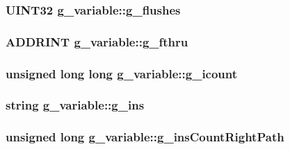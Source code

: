\label{structg__variable_ae22303265d64707d4e5c29a9fc9bae70}
\hypertarget{structg__variable_aee7d9a2652e4ea63755601664d7f2a00}{
\subsubsection[{g\_\-flushes}]{\setlength{\rightskip}{0pt plus 5cm}UINT32 {\bf g\_\-variable::g\_\-flushes}}}
\label{structg__variable_aee7d9a2652e4ea63755601664d7f2a00}
\hypertarget{structg__variable_ab5c10d6f80328bc1f3c99709d7d5db46}{
\subsubsection[{g\_\-fthru}]{\setlength{\rightskip}{0pt plus 5cm}ADDRINT {\bf g\_\-variable::g\_\-fthru}}}
\label{structg__variable_ab5c10d6f80328bc1f3c99709d7d5db46}
\hypertarget{structg__variable_a9ab79f56074bb46d6ae7d797c52442f3}{
\subsubsection[{g\_\-icount}]{\setlength{\rightskip}{0pt plus 5cm}unsigned long long {\bf g\_\-variable::g\_\-icount}}}
\label{structg__variable_a9ab79f56074bb46d6ae7d797c52442f3}
\hypertarget{structg__variable_aa7824f9bbc1a8ff7548bcf42922c0c2b}{
\subsubsection[{g\_\-ins}]{\setlength{\rightskip}{0pt plus 5cm}string {\bf g\_\-variable::g\_\-ins}}}
\label{structg__variable_aa7824f9bbc1a8ff7548bcf42922c0c2b}
\hypertarget{structg__variable_a9849ae320434c4f9d060f131e24509fd}{
\subsubsection[{g\_\-insCountRightPath}]{\setlength{\rightskip}{0pt plus 5cm}unsigned long {\bf g\_\-variable::g\_\-insCountRightPath}}}
